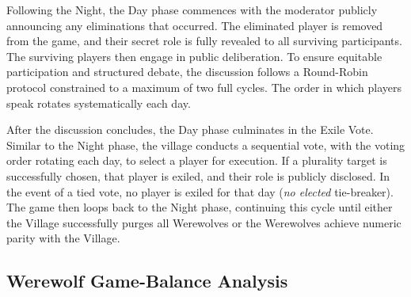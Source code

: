 \documentclass{article}
\begin{document}
Following the Night, the Day phase commences with the moderator publicly announcing any eliminations that occurred. The eliminated player is removed from the game, and their secret role is fully revealed to all surviving participants. The surviving players then engage in public deliberation. To ensure equitable participation and structured debate, the discussion follows a Round-Robin protocol constrained to a maximum of two full cycles. The order in which players speak rotates systematically each day.

After the discussion concludes, the Day phase culminates in the Exile Vote. Similar to the Night phase, the village conducts a sequential vote, with the voting order rotating each day, to select a player for execution. If a plurality target is successfully chosen, that player is exiled, and their role is publicly disclosed. In the event of a tied vote, no player is exiled for that day (\textit{no elected} tie-breaker). The game then loops back to the Night phase, continuing this cycle until either the Village successfully purges all Werewolves or the Werewolves achieve numeric parity with the Village.


\subsection{Werewolf Game-Balance Analysis}
\label{app:werewolf_balance}

\end{document}
